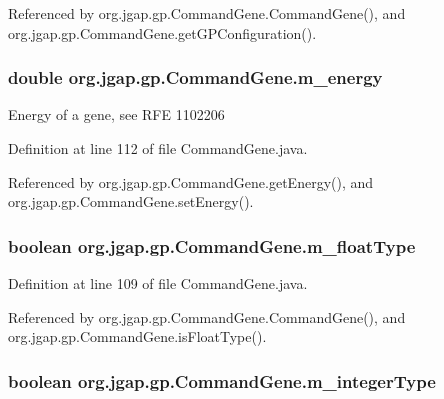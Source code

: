 Referenced by org.\-jgap.\-gp.\-Command\-Gene.\-Command\-Gene(), and org.\-jgap.\-gp.\-Command\-Gene.\-get\-G\-P\-Configuration().

\hypertarget{classorg_1_1jgap_1_1gp_1_1_command_gene_a20b190feb9710d390ee59cbd30386c95}{
\subsubsection[{m\-\_\-energy}]{\setlength{\rightskip}{0pt plus 5cm}double org.\-jgap.\-gp.\-Command\-Gene.\-m\-\_\-energy\hspace{0.3cm}{\ttfamily [private]}}}\label{classorg_1_1jgap_1_1gp_1_1_command_gene_a20b190feb9710d390ee59cbd30386c95}
Energy of a gene, see R\-F\-E 1102206 

Definition at line 112 of file Command\-Gene.\-java.



Referenced by org.\-jgap.\-gp.\-Command\-Gene.\-get\-Energy(), and org.\-jgap.\-gp.\-Command\-Gene.\-set\-Energy().

\hypertarget{classorg_1_1jgap_1_1gp_1_1_command_gene_a7e302c9b5bd345bb9effeb6feccdd439}{
\subsubsection[{m\-\_\-float\-Type}]{\setlength{\rightskip}{0pt plus 5cm}boolean org.\-jgap.\-gp.\-Command\-Gene.\-m\-\_\-float\-Type\hspace{0.3cm}{\ttfamily [private]}}}\label{classorg_1_1jgap_1_1gp_1_1_command_gene_a7e302c9b5bd345bb9effeb6feccdd439}


Definition at line 109 of file Command\-Gene.\-java.



Referenced by org.\-jgap.\-gp.\-Command\-Gene.\-Command\-Gene(), and org.\-jgap.\-gp.\-Command\-Gene.\-is\-Float\-Type().

\hypertarget{classorg_1_1jgap_1_1gp_1_1_command_gene_a9cc9f83eef23abb125cc812b386e40a1}{
\subsubsection[{m\-\_\-integer\-Type}]{\setlength{\rightskip}{0pt plus 5cm}boolean org.\-jgap.\-gp.\-Command\-Gene.\-m\-\_\-integer\-Type\hspace{0.3cm}{\ttfamily [private]}}}\label{classorg_1_1jgap_1_1gp_1_1_command_gene_a9cc9f83eef23abb125cc812b386e40a1}


